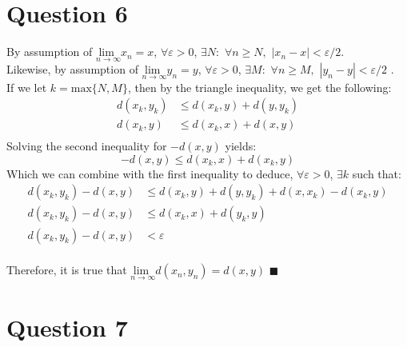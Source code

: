 \documentclass{article}
\newcommand{\lmt}{\underset{n\rightarrow\infty}{\text{lim }}}
\begin{document}


\section*{Question 6}

By assumption of $\lmt x_n = x$, $\forall\varepsilon>0$, $\exists N:$ $\forall n\geq N,$ $|x_n-x|<\varepsilon/2$. \\
Likewise, by assumption of $\lmt y_n = y$, $\forall\varepsilon>0$, $\exists M:$ $\forall n\geq M,$ $|y_n-y|<\varepsilon/2$ .
\medskip \\
If we let $k=\text{max}\{N,M\}$, then by the triangle inequality, we get the following:
\begin{equation*}
	\begin{split}
		d(x_k,y_k) 	&\leq d(x_k,y) + d(y,y_k)	\\
		d(x_k,y)	&\leq d(x_k,x) + d(x,y)		\\
	\end{split}
\end{equation*}
Solving the second inequality for $-d(x,y)$ yields:
\[
	-d(x,y)	\leq d(x_k,x) + d(x_k,y)
\]
Which we can combine with the first inequality to deduce, $\forall\varepsilon>0$, $\exists k$ such that:
\begin{equation*}
	\begin{split}
		d(x_k,y_k)-d(x,y)&\leq d(x_k,y) + d(y,y_k)+d(x,x_k)-d(x_k,y)	\\
		d(x_k,y_k)-d(x,y)&\leq d(x_k,x) + d(y_k,y) 						\\
		d(x_k,y_k)-d(x,y)&< \varepsilon
	\end{split}
\end{equation*}
\bigskip \\
Therefore, it is true that $\lmt d(x_n,y_n) = d(x,y)$ $\blacksquare$



\section*{Question 7}
\end{document}

